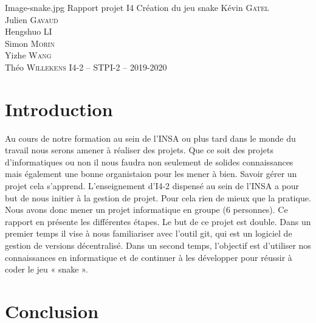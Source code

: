 \documentclass[11pt,a4paper]{article}
\begin{document}
   
    \PageDeGarde
    {Image-snake.jpg}
    {Rapport projet I4}
    {Création du jeu snake}
    {Kévin \textsc{Gatel}\\
    Julien \textsc{Gavaud}\\
    Hengshuo \textsc{LI}\\
    Simon \textsc{Morin}\\
    Yizhe \textsc{Wang}\\
    Théo \textsc{Willekens}} 
    {I4-2 – STPI-2 – 2019-2020}
    
    
    \tableofcontents

    \clearpage 


        \section*{Introduction}
        
        \vspace{1cm} 
        
        Au cours de notre formation au sein de l'INSA ou plus tard dans le monde du travail nous serons amener à réaliser des projets. Que ce soit des projets d'informatiques ou non il nous faudra non seulement de solides connaissances mais également une bonne organistaion pour les mener à bien. Savoir gérer un projet cela s'apprend. L'enseignement d'I4-2 dispensé au sein de l'INSA a pour but de nous initier à la gestion de projet. Pour cela rien de mieux que la pratique. Nous avons donc mener un projet informatique en groupe (6 personnes). Ce rapport en présente les différentes étapes. Le but de ce projet est double. Dans un premier temps il vise à nous familiariser avec l’outil git, qui est un logiciel de gestion de versions décentralisé. Dans un second temps, l’objectif est d’utiliser nos connaissances en informatique et de continuer à les développer pour réussir à coder le jeu « snake ».


        \clearpage 

    
    

    \clearpage 
    
        \section*{Conclusion}
        
\end{document}
